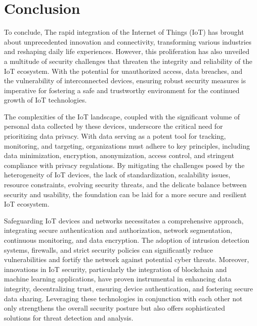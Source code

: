 \documentclass[conference]{IEEEtran}
\begin{document}
\section{Conclusion}
To conclude, The rapid integration of the Internet of Things (IoT) has brought about unprecedented innovation and connectivity, transforming various industries and reshaping daily life experiences. However, this proliferation has also unveiled a multitude of security challenges that threaten the integrity and reliability of the IoT ecosystem. With the potential for unauthorized access, data breaches, and the vulnerability of interconnected devices, ensuring robust security measures is imperative for fostering a safe and trustworthy environment for the continued growth of IoT technologies.

The complexities of the IoT landscape, coupled with the significant volume of personal data collected by these devices, underscore the critical need for prioritizing data privacy. With data serving as a potent tool for tracking, monitoring, and targeting, organizations must adhere to key principles, including data minimization, encryption, anonymization, access control, and stringent compliance with privacy regulations. By mitigating the challenges posed by the heterogeneity of IoT devices, the lack of standardization, scalability issues, resource constraints, evolving security threats, and the delicate balance between security and usability, the foundation can be laid for a more secure and resilient IoT ecosystem.

Safeguarding IoT devices and networks necessitates a comprehensive approach, integrating secure authentication and authorization, network segmentation, continuous monitoring, and data encryption. The adoption of intrusion detection systems, firewalls, and strict security policies can significantly reduce vulnerabilities and fortify the network against potential cyber threats. Moreover, innovations in IoT security, particularly the integration of blockchain and machine learning applications, have proven instrumental in enhancing data integrity, decentralizing trust, ensuring device authentication, and fostering secure data sharing. Leveraging these technologies in conjunction with each other not only strengthens the overall security posture but also offers sophisticated solutions for threat detection and analysis.
\end{document}
